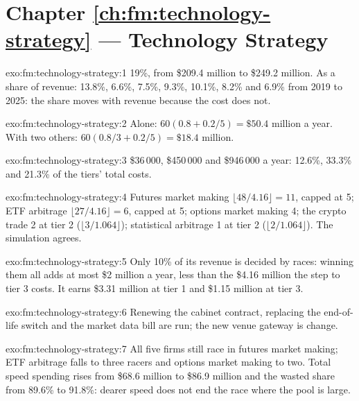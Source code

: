 \section*{Chapter \ref{ch:fm:technology-strategy} --- Technology Strategy}

\begin{solution}{exo:fm:technology-strategy:1}
19\%, from \$209.4 million to \$249.2 million. As a share of revenue: 13.8\%, 6.6\%, 7.5\%, 9.3\%, 10.1\%, 8.2\% and 6.9\% from 2019 to 2025: the
share moves with revenue because the cost does not.
\end{solution}

\begin{solution}{exo:fm:technology-strategy:2}
Alone: $60(0.8+0.2/5)=\$50.4$ million a year. With two others: $60(0.8/3+0.2/5)=\$18.4$ million.
\end{solution}

\begin{solution}{exo:fm:technology-strategy:3}
\$36\,000, \$450\,000 and \$946\,000 a year: 12.6\%, 33.3\% and 21.3\% of the tiers' total costs.
\end{solution}

\begin{solution}{exo:fm:technology-strategy:4}
Futures market making $\lfloor48/4.16\rfloor=11$, capped at 5; ETF arbitrage $\lfloor27/4.16\rfloor=6$, capped at 5; options market making 4;
the crypto trade 2 at tier 2 ($\lfloor3/1.064\rfloor$); statistical arbitrage 1 at tier 2 ($\lfloor2/1.064\rfloor$). The simulation agrees.
\end{solution}

\begin{solution}{exo:fm:technology-strategy:5}
Only 10\% of its revenue is decided by races: winning them all adds at most \$2 million a year, less than the \$4.16 million the step to tier 3
costs. It earns \$3.31 million at tier 1 and \$1.15 million at tier 3.
\end{solution}

\begin{solution}{exo:fm:technology-strategy:6}
Renewing the cabinet contract, replacing the end-of-life switch and the market data bill are run; the new venue gateway is change.
\end{solution}

\begin{solution}{exo:fm:technology-strategy:7}
All five firms still race in futures market making; ETF arbitrage falls to three racers and options market making to two. Total speed spending
rises from \$68.6 million to \$86.9 million and the wasted share from 89.6\% to 91.8\%: dearer speed does not end the race where the pool is large.
\end{solution}

